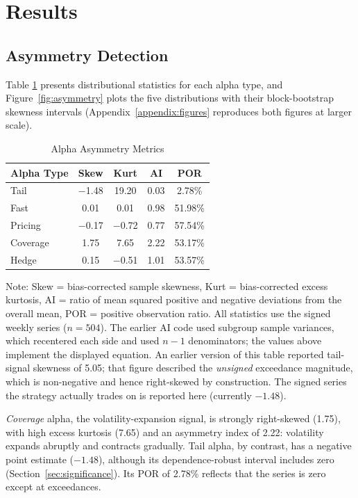\documentclass[11pt]{article}
\begin{document}
\section{Results}

\subsection{Asymmetry Detection}
\label{sec:asymdetect}

Table \ref{tab:asymmetry} presents distributional statistics for each alpha type, and Figure~\ref{fig:asymmetry} plots the five distributions with their block-bootstrap skewness intervals (Appendix~\ref{appendix:figures} reproduces both figures at larger scale).

\begin{table}[H]
\centering
\caption{Alpha Asymmetry Metrics}
\label{tab:asymmetry}
\small
\begin{tabular}{@{}lcccc@{}}
\toprule
Alpha Type & Skew & Kurt & AI & POR \\
\midrule
Tail & $-$1.48 & 19.20 & 0.03 & 2.78\% \\
Fast & 0.01 & 0.01 & 0.98 & 51.98\% \\
Pricing & $-$0.17 & $-$0.72 & 0.77 & 57.54\% \\
Coverage & 1.75 & 7.65 & 2.22 & 53.17\% \\
Hedge & 0.15 & $-$0.51 & 1.01 & 53.57\% \\
\bottomrule
\end{tabular}
\par\vspace{0.3em}
\parbox{\linewidth}{\footnotesize Note: Skew = bias-corrected sample skewness, Kurt = bias-corrected excess kurtosis, AI = ratio of mean squared positive and negative deviations from the overall mean, POR = positive observation ratio. All statistics use the signed weekly series ($n = 504$). The earlier AI code used subgroup sample variances, which recentered each side and used $n-1$ denominators; the values above implement the displayed equation. An earlier version of this table reported tail-signal skewness of 5.05; that figure described the \emph{unsigned} exceedance magnitude, which is non-negative and hence right-skewed by construction. The signed series the strategy actually trades on is reported here (currently $-1.48$).}
\end{table}

\emph{Coverage} alpha, the volatility-expansion signal, is strongly right-skewed (1.75), with high excess kurtosis (7.65) and an asymmetry index of 2.22: volatility expands abruptly and contracts gradually. Tail alpha, by contrast, has a negative point estimate ($-1.48$), although its dependence-robust interval includes zero (Section~\ref{sec:significance}). Its POR of 2.78\% reflects that the series is zero except at exceedances.
\end{document}
